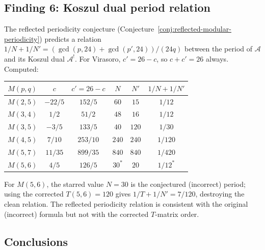 \documentclass[11pt]{article}
\begin{document}
\subsection*{Finding 6: Koszul dual period relation}

The reflected periodicity conjecture
(Conjecture~\ref*{conj:reflected-modular-periodicity}) predicts a
relation $1/N + 1/N' = (\gcd(p,24) + \gcd(p',24))/(24q)$ between
the period of $\mathcal{A}$ and its Koszul dual $\mathcal{A}^!$.
For Virasoro, $c' = 26 - c$, so $c + c' = 26$ always.  Computed:

\begin{center}
\small
\renewcommand{\arraystretch}{1.15}
\begin{tabular}{cccccc}
$M(p,q)$ & $c$ & $c' = 26-c$ & $N$ & $N'$ & $1/N + 1/N'$ \\
\hline
$M(2,5)$ & $-22/5$ & $152/5$ & $60$ & $15$ & $1/12$ \\
$M(3,4)$ & $1/2$ & $51/2$ & $48$ & $16$ & $1/12$ \\
$M(3,5)$ & $-3/5$ & $133/5$ & $40$ & $120$ & $1/30$ \\
$M(4,5)$ & $7/10$ & $253/10$ & $240$ & $240$ & $1/120$ \\
$M(5,7)$ & $11/35$ & $899/35$ & $840$ & $840$ & $1/420$ \\
$M(5,6)$ & $4/5$ & $126/5$ & $30^*$ & $20$ & $1/12^*$
\end{tabular}
\end{center}
For $M(5,6)$, the starred value $N = 30$ is the conjectured
(incorrect) period; using the corrected $T(5,6) = 120$ gives
$1/T + 1/N' = 7/120$, destroying the clean relation.  The
reflected periodicity relation is consistent with the original
(incorrect) formula but not with the corrected $T$-matrix order.

\subsection*{Conclusions}
\end{document}
